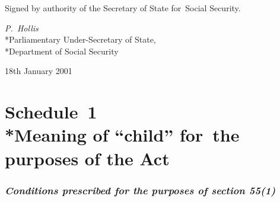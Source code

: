 \documentclass[12pt,a4paper]{article}
\begin{document}
Signed 
by authority of the Secretary of State for~Social Security.

{\raggedleft
\emph{P.~Hollis}\\*Parliamentary Under-Secretary of State,\\*Department of Social Security

}

18th January 2001

\vfill

\small

\part[Schedule~1 --- Meaning of “child” for~the purposes of the Act]{Schedule~1\\*Meaning of “child” for~the purposes of the Act}

\renewcommand\parthead{--- Schedule~1}


\section*{\itshape Conditions prescribed for the purposes of section 55(1)}
\end{document}

